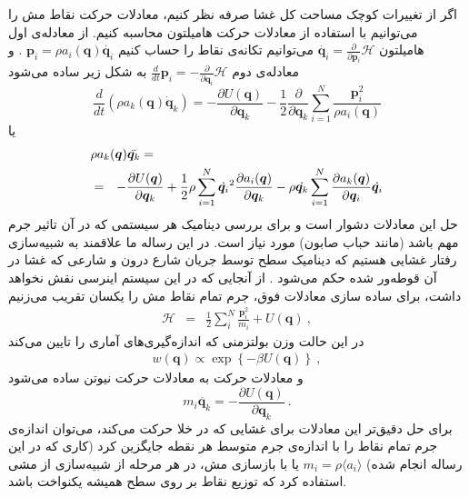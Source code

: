 اگر از تغییرات کوچک مساحت کل غشا صرفه نظر کنیم، معادلات حرکت نقاط مش را می‌توانیم با استفاده از معادلات حرکت هامیلتون محاسبه کنیم. از معادله‌ی اول هامیلتون 
$\dot {\bm q_i}=\frac{\partial}{\partial \bm p_i}\mathcal H$
می‌توانیم تکانه‌ی نقاط را حساب کنیم
$\bm p_i = \rho a_i(\bm q)\dot {\bm q_i}$
. و معادله‌ی دوم 
$\frac{d}{dt} \bm p_i = -\frac{\partial}{\partial \bm q_i}\mathcal H$
به شکل زیر ساده می‌شود
\begin{equation}
\frac{d}{dt}(\rho a_k(\bm q) \dot {\bm q}_k) = -\frac{\partial U(\bm q)}{\partial \bm q_k} - \frac{1}{2} \frac{\partial}{\partial \bm q_k}\sum_{i=1}^N\frac{\bm p_i^2}{\rho a_i(\bm q)} \end{equation}
یا
\begin{eqnarray}
\lefteqn{  \rho a_k(\bm q) \ddot{\bm q_k}  =}
\label{eq:HamiltonianGeneralEOMMomentum}\\
 &=& -\frac{\partial U(\bm q)}{\partial \bm q_k} + \frac{1}{2}\rho \sum_{i=1}^N\dot{\bm q_i}^2\frac{\partial a_i(\bm q)}{\partial \bm q_k}
 - \rho  \dot{\bm q_k}\sum_{i=1}^N\frac{\partial a_k(\bm q)}{\partial \bm q_i}\dot{\bm q_i}\nonumber
\end{eqnarray}
حل این معادلات دشوار است و برای بررسی دینامیک هر سیستمی که در آن تاثیر جرم مهم باشد (مانند حباب صابون) مورد نیاز است. در این رساله ما علاقمند به شبیه‌سازی رفتار غشایی هستیم که دینامیک سطح توسط جریان شارع درون و شارعی که غشا در آن قوطه‌ور شده حکم می‌شود
\cite{milnersafranPRA1987, schneider1984}
. از آنجایی که در این سیستم اینرسی نقش نخواهد داشت، برای ساده سازی معادلات فوق، جرم تمام نقاط مش را یکسان تقریب می‌زنیم
\begin{eqnarray}
\mathcal H&=& \frac12 \sum_i^N \frac{\bm p_i^2}{m_i} + U(\bm q) 
\label{eq:HamiltonianFixedMass} \ ,
\end{eqnarray}
در این حالت وزن بولتزمنی که اندازه‌گیری‌های آماری را تایین می‌کند
\begin{equation}
\begin{aligned}
w(\bm q)\propto\exp\left\{-\beta U(\bm q)\right\} \ ,
\end{aligned}
\label{eq:microStateProbability HamiltonianFixedMass}
\end{equation}
و معادلات حرکت به معادلات حرکت نیوتن ساده می‌شود
\begin{equation}
m_i \ddot{\bm q_k} = -\frac{\partial U(\bm q)}{\partial \bm q_k} \ .
\label{eq:EoM for HamiltonianFixedMass}
\end{equation}
برای حل دقیق‌تر این معادلات برای غشایی که در خلا حرکت می‌کند، می‌توان اندازه‌ی جرم تمام نقاط را با اندازه‌ی جرم متوسط هر نقطه جایگزین کرد (کاری که در این رساله انجام شده) 
$m_i = \rho \langle a_i \rangle$
یا با بازسازی مش، در هر مرحله از شبیه‌سازی از مشی‌ استفاده کرد که توزیع نقاط بر روی سطح همیشه یکنواخت باشد.





 










